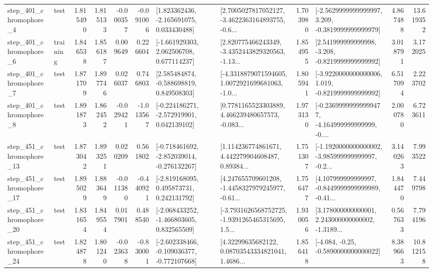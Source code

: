 \begin{tabular}{llrrrrllrlrr}
   step\_401\_chromophore\_4 &      test &      1.815490 &    1.815133 &     -0.000357 & -0.091006 &    [1.823362436, -2.165691075, 0.033430488] &  [2.7005027817052127, -3.4622363164893755, -0.6... &       1.703980 &  [-2.5629999999999997, 3.209, -0.3819999999999979] &            4.867488 &         13.619352 \\
   step\_401\_chromophore\_6 &  training &      1.846538 &    1.856187 &      0.009649 &  0.226604 &    [-1.661929303, 2.062506708, 0.677114237] &  [2.820775466243349, -3.4352443829320563, -1.13... &       1.854955 &   [2.541999999999998, -3.208, -0.8219999999999992] &            3.018791 &          3.172025 \\
   step\_401\_chromophore\_7 &      test &      1.871709 &    1.897746 &      0.026037 &  0.746803 &    [2.585484874, -0.588698819, 0.849508303] &  [-4.3318879071594605, 1.0072921699681063, -1.0... &       1.805941 &  [-3.9220000000000006, 1.019, -0.8219999999999992] &            6.517094 &          2.223702 \\
   step\_401\_chromophore\_8 &      test &      1.891873 &    1.862452 &     -0.029421 & -1.013567 &   [-0.224186271, -2.572919901, 0.042139102] &  [0.7781165523303889, 4.466239480657573, -0.083... &       1.973130 &  [-0.23699999999999477, -4.164999999999999, -0.... &            2.000780 &          6.723611 \\
  step\_451\_chromophore\_13 &      test &      1.873042 &    1.893251 &      0.020209 &  0.561802 &  [-0.718461692, -2.852039014, -0.276132267] &  [1.114236774861671, 4.442279904608487, 0.89384... &       1.751307 &  [-1.1920000000000002, -3.985999999999997, -0.2... &            3.140263 &          7.993522 \\
  step\_451\_chromophore\_17 &      test &      1.895029 &    1.883649 &     -0.011380 & -0.440921 &    [-2.819168095, 0.495873731, 0.242131792] &  [4.247655709601208, -1.4458327979245977, -0.61... &       1.756477 &  [4.107999999999997, -0.8449999999999989, -0.41... &            1.844470 &          7.449798 \\
  step\_451\_chromophore\_20 &      test &      1.831654 &    1.849554 &      0.017901 &  0.488540 &   [-2.068433252, -1.466803605, 0.832565509] &  [-3.7931626568752725, -1.9391265465315695, 1.5... &       1.930056 &  [3.178000000000001, 2.243000000000002, -1.3189... &            0.567633 &          7.794196 \\
  step\_451\_chromophore\_24 &      test &      1.824878 &    1.801240 &     -0.023638 & -0.830001 &  [-2.602338466, -0.109036377, -0.772107668] &  [4.32299635682122, 0.08703543334821041, 1.4686... &       1.856418 &               [-4.084, -0.25, -0.5890000000000022] &            8.389663 &         10.812158 \\

\end{tabular}
